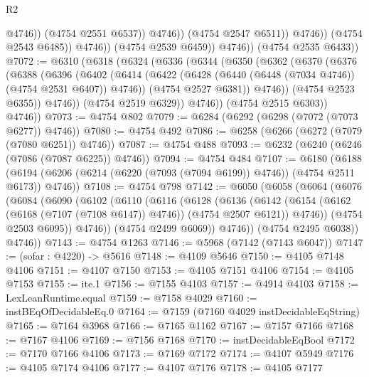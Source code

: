 \begin{lexlean}{R2}
\begin{coremodule}
                                  @4746))
                              (@4754 @2551 @6537))
                            @4746))
                        (@4754 @2547 @6511))
                      @4746))
                  (@4754 @2543 @6485))
                @4746))
            (@4754 @2539 @6459))
          @4746))
      (@4754 @2535 @6433))
@7072 := @6310
    (@6318
      (@6324
        (@6336
          (@6344
            (@6350
              (@6362
                (@6370
                  (@6376
                    (@6388
                      (@6396
                        (@6402
                          (@6414
                            (@6422 (@6428 (@6440 (@6448 (@7034 @4746)) (@4754 @2531 @6407)) @4746))
                            (@4754 @2527 @6381))
                          @4746))
                      (@4754 @2523 @6355))
                    @4746))
                (@4754 @2519 @6329))
              @4746))
          (@4754 @2515 @6303))
        @4746))
@7073 := @4754 @802
@7079 := @6284 (@6292 (@6298 (@7072 (@7073 @6277)) @4746))
@7080 := @4754 @492
@7086 := @6258 (@6266 (@6272 (@7079 (@7080 @6251)) @4746))
@7087 := @4754 @488
@7093 := @6232 (@6240 (@6246 (@7086 (@7087 @6225)) @4746))
@7094 := @4754 @484
@7107 := @6180
    (@6188 (@6194 (@6206 (@6214 (@6220 (@7093 (@7094 @6199)) @4746)) (@4754 @2511 @6173)) @4746))
@7108 := @4754 @798
@7142 := @6050
    (@6058
      (@6064
        (@6076
          (@6084
            (@6090
              (@6102
                (@6110
                  (@6116
                    (@6128
                      (@6136
                        (@6142
                          (@6154 (@6162 (@6168 (@7107 (@7108 @6147)) @4746)) (@4754 @2507 @6121))
                          @4746))
                      (@4754 @2503 @6095))
                    @4746))
                (@4754 @2499 @6069))
              @4746))
          (@4754 @2495 @6038))
        @4746))
@7143 := @4754 @1263
@7146 := @5968 (@7142 (@7143 @6047))
@7147 := (sofar : @4220) -> @5616
@7148 := @4109 @5646
@7150 := @4105 @7148 @4106
@7151 := @4107 @7150
@7153 := @4105 @7151 @4106
@7154 := @4105 @7153
@7155 := ite.{1}
@7156 := @7155 @4103
@7157 := @4914 @4103
@7158 := LexLeanRuntime.equal
@7159 := @7158 @4029
@7160 := instBEqOfDecidableEq.{0}
@7164 := @7159 (@7160 @4029 instDecidableEqString)
@7165 := @7164 @3968
@7166 := @7165 @1162
@7167 := @7157 @7166
@7168 := @7167 @4106
@7169 := @7156 @7168
@7170 := instDecidableEqBool
@7172 := @7170 @7166 @4106
@7173 := @7169 @7172
@7174 := @4107 @5949
@7176 := @4105 @7174 @4106
@7177 := @4107 @7176
@7178 := @4105 @7177

\end{coremodule}
\end{lexlean}
